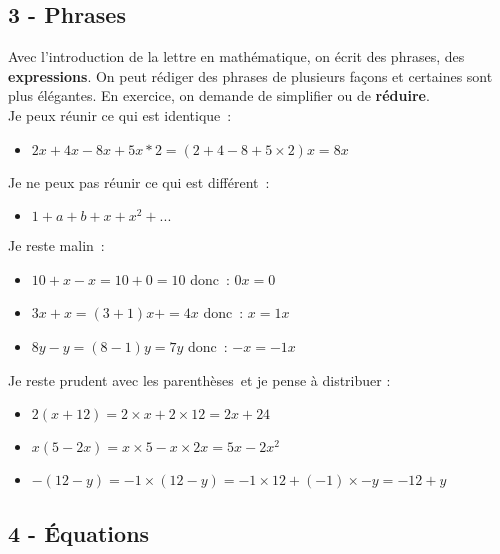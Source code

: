 \documentclass[11pt]{article}
\begin{document}
\newpage

\subsection*{3 - Phrases}

Avec l’introduction de la lettre en mathématique, on écrit des phrases, des \textbf{expressions}. On peut rédiger des phrases de plusieurs façons et certaines sont plus élégantes. En exercice, on demande de simplifier ou de \textbf{réduire}.\\

Je peux réunir ce qui est identique : 
\begin{itemize}
\item $2x + 4x - 8x + 5x * 2 =  (2+4-8+5 \times 2)x = 8x$
\end{itemize} Je ne peux pas réunir ce qui est différent :
\begin{itemize}
\item $1 + a + b + x + x^2 + ...$
\end{itemize} 

Je reste malin : 

\begin{itemize}
\item $10 + x - x = 10 + 0 = 10$   donc : $0x = 0$
\item $3x + x = (3+1)x + = 4x$ donc : $x=1x$
\item $8y - y = (8-1)y = 7y$ donc : $-x = -1x$
\end{itemize}

Je reste prudent avec les parenthèses et je pense à distribuer : 

\begin{itemize}
\item $2(x+12) = 2 \times x+2 \times12 = 2x + 24$
\item $x(5 - 2x) = x \times 5 - x  \times 2x = 5x  - 2x^2$
\item $-(12 - y) = -1 \times (12-y) = -1 \times 12 + (-1) \times -y = -12 + y$
\end{itemize} 

\subsection*{4 - Équations}
\end{document}
